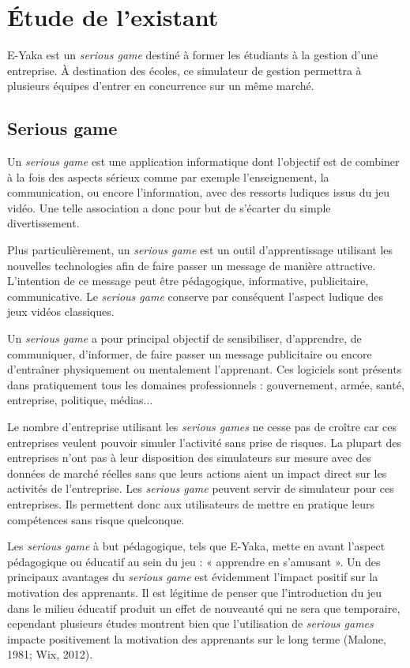 \chapter{Étude de l’existant  }

    E-Yaka est un \emph{serious game} destiné à former les étudiants à la gestion d'une entreprise. À destination des écoles, ce simulateur de gestion permettra à plusieurs équipes d'entrer en concurrence sur un même marché.

    \section{Serious game}

        Un \emph{serious game} est une application informatique dont l'objectif est de combiner à la fois des aspects sérieux comme par exemple l'enseignement, la communication, ou encore l'information, avec des ressorts ludiques issus du jeu vidéo. Une telle association a donc pour but de s'écarter du simple divertissement.

        Plus particulièrement, un \emph{serious game} est un outil d’apprentissage utilisant les nouvelles technologies afin de faire passer un message de manière attractive. L’intention de ce message peut être pédagogique, informative, publicitaire, communicative. Le \emph{serious game} conserve par conséquent l’aspect ludique des jeux vidéos classiques.

        Un \emph{serious game} a pour principal objectif de sensibiliser, d’apprendre, de communiquer, d’informer, de faire passer un message publicitaire ou encore d’entraîner physiquement ou mentalement l’apprenant. Ces logiciels sont présents dans pratiquement tous les domaines professionnels : gouvernement, armée, santé, entreprise, politique, médias...

        Le nombre d’entreprise utilisant les \emph{serious games} ne cesse pas de croître car ces entreprises veulent pouvoir simuler l’activité sans prise de risques. La plupart des entreprises n’ont pas à leur disposition des simulateurs sur mesure avec des données de marché réelles sans que leurs actions aient un impact direct sur les activités de l’entreprise. Les \emph{serious game} peuvent servir de simulateur pour ces entreprises. Ils permettent donc aux utilisateurs de mettre en pratique leurs compétences sans risque quelconque.

        Les \emph{serious game} à but pédagogique, tels que E-Yaka, mette en avant l’aspect pédagogique ou éducatif au sein du jeu : « apprendre en s’amusant ». Un des principaux avantages du \emph{serious game} est évidemment l’impact positif sur la motivation des apprenants. Il est légitime de penser que l’introduction du jeu dans le milieu éducatif produit un effet de nouveauté qui ne sera que temporaire, cependant plusieurs études montrent bien que l’utilisation de \emph{serious games} impacte positivement la motivation des apprenants sur le long terme (Malone, 1981; Wix, 2012).

